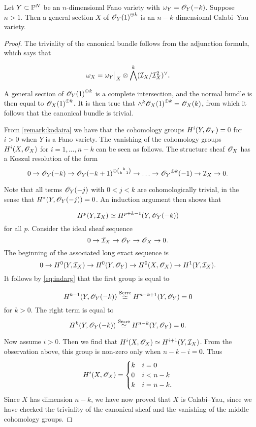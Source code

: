 \begin{proposition}
\label{prop:anticanonicalsection}
Let $Y \subset \P^N$ be an $n$-dimensional Fano variety with ${\omega_Y=\OO_Y(-k)}$. Suppose $n > 1$. Then a general section $X$ of ${\OO_Y(1)}^{\oplus k}$ is an $n-k$-dimensional Calabi--Yau variety.
\end{proposition}
\begin{proof}
The triviality of the canonical bundle follows from the adjunction formula, which says that

$$
\omega_X = \restr{\omega_Y}{X} \otimes \bigwedge^k (\mathcal I_X /\mathcal I_X^2)^\vee.
$$

A general section of ${\OO_Y(1)}^{\oplus k}$ is a complete intersection, and the normal bundle is then equal to ${\OO_X(1)}^{\oplus k}$. It is then true that $\wedge^k {\OO_X(1)}^{\oplus k} = \OO_X(k)$, from which it follows that the canonical bundle is trivial.

From \cref{remark:kodaira} we have that the cohomology groups $H^i(Y,\OO_Y)=0$ for $ i> 0$ when $Y$ is a Fano variety. The vanishing of the cohomology groups $H^i(X,\OO_X)$ for $i=1,\ldots,n-k$ can be seen as follows. The structure sheaf $\OO_X$ has a Koszul resolution of the form
\[
0 \to \OO_Y(-k) \to {\OO_Y(-k+1)}^{\oplus \binom {k}{k-1}} \to \ldots \to {\OO_Y}^{\oplus k}(-1) \to \mathcal I_X \to 0.
\]

Note that all terms $\OO_Y(-j)$ with $0 < j < k$ are cohomologically trivial, in the sense that $H^\ast(Y,\OO_Y(-j))=0$. An induction argument then shows that

\begin{equation}
\label{eq:indarg}
H^p(Y,\mathcal I_X) \simeq H^{p+k-1}(Y,\OO_Y(-k))
\end{equation}
for all $p$. Consider the ideal sheaf sequence
\[
0 \to \mathcal I_X \to \OO_Y \to \OO_X  \to 0.
\]
The beginning of the associated long exact sequence is 
\[
0 \to H^0(Y,\mathcal I_X) \to H^0(Y,\OO_Y) \to H^0(X,\OO_X) \to H^1(Y,\mathcal I_X).
\]
It follows by \eqref{eq:indarg} that the first group is equal to

\[
H^{k-1}(Y,\OO_Y(-k)) \stackrel{\text{Serre}}{\simeq} H^{n-k+1}(Y,\OO_Y)=0\]
for $k > 0$.  The right term is equal to
\[
H^{k}(Y,\OO_Y(-k))  \stackrel{\text{Serre}}{\simeq} H^{n-k}(Y,\OO_Y)=0.
\]

Now assume $i > 0$. Then we find that $H^i(X,\OO_X) \simeq H^{i+1}(Y,\mathcal I_X)$. From the observation above, this group is non-zero only when $n-k-i=0$. Thus
\[
H^i(X,\OO_X) = 
\begin{cases}
k &  i = 0 \\
0 & i < n-k \\
k & i =n-k.
\end{cases}
\]
Since $X$ has dimension $n-k$, we have now proved that $X$ is Calabi--Yau, since we have checked the triviality of the canonical sheaf and the vanishing of the middle cohomology groups.
\end{proof}

